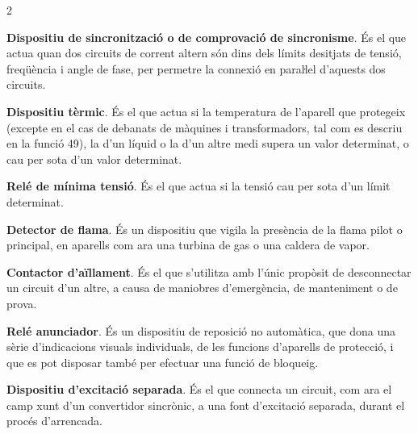 \begin{multicols}{2}
\begin{list}{}
		\item[\textbf{25}]   
		\textbf{Dispositiu de sincronització o de comprovació de sincronisme}. És el que actua quan dos circuits de corrent altern
		són dins dels límits desitjats de tensió, freqüència i angle de
		fase, per permetre la connexió en paraŀlel d'aquests dos circuits.
		
		
		\item[\textbf{26}]    
		\textbf{Dispositiu tèrmic}. És el que
		actua si la temperatura de l'aparell que protegeix (excepte en el cas de debanats de màquines i transformadors, tal com es descriu en la funció 49), la d'un líquid o la d'un altre medi  supera un valor
		determinat, o cau per sota d'un valor determinat.
		
		
		\item[\textbf{27}]   
		\textbf{Relé de mínima tensió}. És el que
		actua si la tensió cau per sota d'un límit determinat.
		
		\item[\textbf{28}]   
		\textbf{Detector de flama}. És un dispositiu que vigila la presència de la flama pilot o principal, en aparells  com ara una turbina de gas o una caldera  de vapor.
		
		\item[\textbf{29}]  
		\textbf{Contactor d'aïllament}. És el que
		s'utilitza amb l'únic propòsit de desconnectar un circuit d'un
		altre,  a  causa de maniobres    d'emergència,  de manteniment o de
		prova.
		
		\item[\textbf{30}]  
		\textbf{Relé anunciador}. És un dispositiu de
		reposició no automàtica, que dona una sèrie d'indicacions visuals
		individuals, de les funcions d'aparells de protecció, i que es pot
		disposar també per efectuar una funció de bloqueig.
		
		\item[\textbf{31}]  
		\textbf{Dispositiu d'excitació separada}. És el que connecta un circuit, com ara el camp xunt
		d'un convertidor sincrònic, a una font d'excitació separada, durant el procés
		d'arrencada.
		

\end{list}
\end{multicols}
